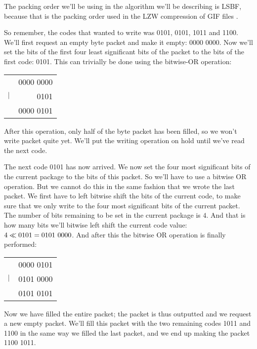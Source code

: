 \begin{refsection}
The packing order we'll be using in the algorithm we'll be describing is LSBF,
because that is the packing order used in the LZW compression of GIF
files \cite{gif89a}.

So remember, the codes that wanted to write was 0101, 0101, 1011 and
1100. We'll first request an empty byte packet and make it empty:
0000 0000. Now we'll set the bits of the first four least
significant bits of the packet to the bits of the first code:
0101. This can trivially be done using the bitwise-OR operation:

\begin{center}
  \begin{tabular}{lr}
    & 0000 0000  \\
    $\mathrel{|}$ & 0101 \\
    \hline
    & 0000 0101 \\
  \end{tabular}
\end{center}

After this operation, only half of the byte packet has been filled, so
we won't write packet quite yet. We'll put the writing operation on
hold until we've read the next code.

The next code 0101 has now arrived. We now set the four most
significant bits of the current package to the bits of this packet. So
we'll have to use a bitwise OR operation. But we cannot do this in the
same fashion that we wrote the last packet. We first have to left
bitwise shift the bits of the current code, to make sure that we only
write to the four most significant bits of the current packet. The
number of bits remaining to be set in the current package is $4$. And
that is how many bits we'll bitwise left shift the current code value:
$4 \ShiftLeft 0101 = 0101\ 0000$. And after this the bitwise OR
operation is finally performed:

\begin{center}
  \begin{tabular}{lr}
    & 0000 0101  \\
    $\mathrel{|}$ & 0101 0000 \\
    \hline
    & 0101 0101 \\
  \end{tabular}
\end{center}

Now we have filled the entire packet; the packet is thus outputted and
we request a new empty packet. We'll fill this packet with the two
remaining codes 1011 and 1100 in the same way we filled the last
packet, and we end up making the packet  1100 1011.


\end{refsection}
